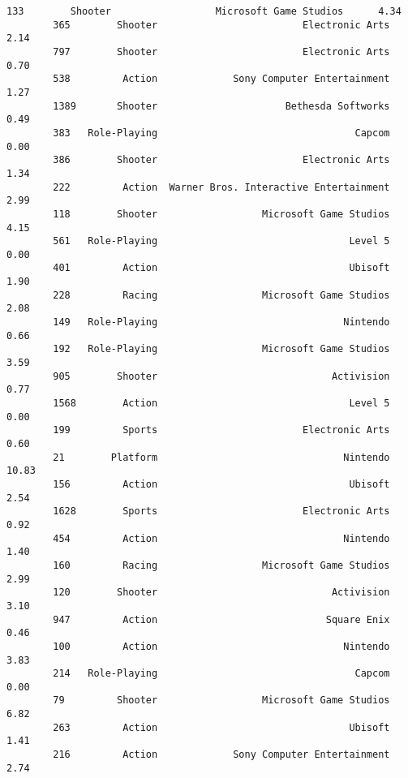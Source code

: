 \documentclass[11pt]{article}
\begin{document}
\begin{Verbatim}[commandchars=\\\{\}]
        133        Shooter                  Microsoft Game Studios      4.34   
        365        Shooter                         Electronic Arts      2.14   
        797        Shooter                         Electronic Arts      0.70   
        538         Action             Sony Computer Entertainment      1.27   
        1389       Shooter                      Bethesda Softworks      0.49   
        383   Role-Playing                                  Capcom      0.00   
        386        Shooter                         Electronic Arts      1.34   
        222         Action  Warner Bros. Interactive Entertainment      2.99   
        118        Shooter                  Microsoft Game Studios      4.15   
        561   Role-Playing                                 Level 5      0.00   
        401         Action                                 Ubisoft      1.90   
        228         Racing                  Microsoft Game Studios      2.08   
        149   Role-Playing                                Nintendo      0.66   
        192   Role-Playing                  Microsoft Game Studios      3.59   
        905        Shooter                              Activision      0.77   
        1568        Action                                 Level 5      0.00   
        199         Sports                         Electronic Arts      0.60   
        21        Platform                                Nintendo     10.83   
        156         Action                                 Ubisoft      2.54   
        1628        Sports                         Electronic Arts      0.92   
        454         Action                                Nintendo      1.40   
        160         Racing                  Microsoft Game Studios      2.99   
        120        Shooter                              Activision      3.10   
        947         Action                             Square Enix      0.46   
        100         Action                                Nintendo      3.83   
        214   Role-Playing                                  Capcom      0.00   
        79         Shooter                  Microsoft Game Studios      6.82   
        263         Action                                 Ubisoft      1.41   
        216         Action             Sony Computer Entertainment      2.74   
        

\end{Verbatim}
\end{document}
